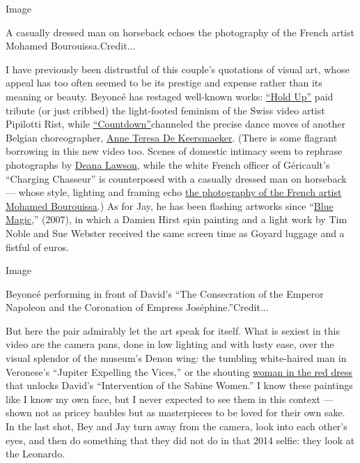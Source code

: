 Image

A casually dressed man on horseback echoes the photography of the French
artist Mohamed Bourouissa.Credit...

I have previously been distrustful of this couple's quotations of visual
art, whose appeal has too often seemed to be its prestige and expense
rather than its meaning or beauty. Beyoncé has restaged well-known
works:
\href{https://www.independent.co.uk/arts-entertainment/music/news/beyonce-accused-of-stealing-pipilotti-rists-visuals-for-hold-up-music-video-a7010966.html}{``Hold
Up''} paid tribute (or just cribbed) the light-footed feminism of the
Swiss video artist Pipilotti Rist, while
\href{https://www.youtube.com/watch?v=2XY3AvVgDns}{``Countdown''}channeled
the precise dance moves of another Belgian choreographer,
\href{http://www.rosas.be/en/8-anne-teresa-de-keersmaeker}{Anne Teresa
De Keersmaeker}. (There is some flagrant borrowing in this new video
too. Scenes of domestic intimacy seem to rephrase photographs by
\href{https://www.newyorker.com/magazine/2018/05/07/deana-lawsons-kingdom-of-restored-glory}{Deana
Lawson}, while the white French officer of Géricault's ``Charging
Chasseur'' is counterposed with a casually dressed man on horseback ---
whose style, lighting and framing echo
\href{https://www.nytimes.com/2018/03/28/arts/design/mohamed-bourouissa-urban-cowboys.html}{the
photography of the French artist Mohamed Bourouissa}.) As for Jay, he
has been flashing artworks since
``\href{https://www.youtube.com/watch?v=0O3USgkwiJA}{Blue Magic},''
(2007), in which a Damien Hirst spin painting and a light work by Tim
Noble and Sue Webster received the same screen time as Goyard luggage
and a fistful of euros.

Image

Beyoncé performing in front of David's ``The Consecration of the Emperor
Napoleon and the Coronation of Empress Joséphine.''Credit...

But here the pair admirably let the art speak for itself. What is
sexiest in this video are the camera pans, done in low lighting and with
lusty ease, over the visual splendor of the museum's Denon wing: the
tumbling white-haired man in Veronese's ``Jupiter Expelling the Vices,''
or the shouting
\href{https://books.google.fr/books?id=PfS0boVIzX0C\&pg=PA234\&lpg=PA234\&dq=ewa+lajer-burcharth+necklines+red+dress\&source=bl\&ots=HmL2lgCild\&sig=CkG-0DI8DVDQWnxEwHI_lVarct4\&hl=en\&sa=X\&redir_esc=y\#v=onepage\&q=ewa\%20lajer-burcharth\%20necklines\%20red\%20dress\&f=false}{woman
in the red dress} that unlocks David's ``Intervention of the Sabine
Women.'' I know these paintings like I know my own face, but I never
expected to see them in this context --- shown not as pricey baubles but
as masterpieces to be loved for their own sake. In the last shot, Bey
and Jay turn away from the camera, look into each other's eyes, and then
do something that they did not do in that 2014 selfie: they look at the
Leonardo.

